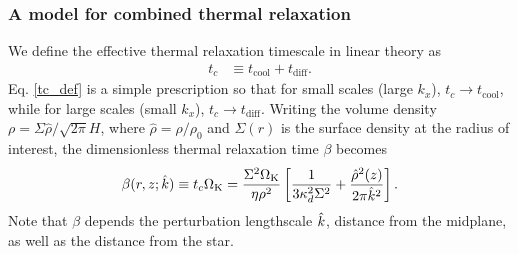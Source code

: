 \subsubsection{A model for combined thermal relaxation}\label{toy_relax}
We define the effective thermal relaxation timescale in linear theory as
\begin{align}\label{tc_def}
  t_c &\equiv t_\mathrm{cool} + t _\mathrm{diff}. %
\end{align}
Eq. \ref{tc_def} is a simple prescription so
that for small scales (large $k_x$), $t_c\to t_\mathrm{cool}$, while
for large scales (small $k_x$), $t_c\to t_\mathrm{diff}$. Writing the
volume density $\rho = \Sigma\hat{\rho}/\sqrt{2\pi}H$, where
$\hat{\rho} = \rho/\rho_0$ and $\Sigma(r)$ is the surface density at the
radius of interest, the dimensionless thermal
relaxation time $\beta$ becomes 
\begin{align}\label{real_beta}
  \beta(r,z;\hat{k}) \equiv t_c\Omega_{\rm K} =
  \frac{\Sigma^2\Omega_{\rm K}}{\eta\rho^2}\left[\frac{1}{3\kappa_d^2\Sigma^2} 
    + \frac{\hat{\rho}^2(z)}{2\pi \hat{k}^2}\right].
\end{align}
Note that $\beta$ depends the perturbation lengthscale $\hat{k}$,
distance from the midplane, as well as the distance from the star.  


